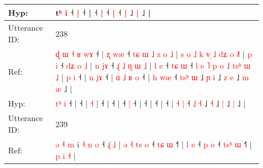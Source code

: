\documentclass[10pt]{article}
\DeclareRobustCommand{\hl}[1]{{\textcolor{red}{#1}}}
\begin{document}
\begin{longtable}{ll}
Hyp: & \hl{}\hl{}\hl{}\hl{}\hl{}\hl{}\hl{}t\hl{}\hl{}\hl{}\hl{}\hl{}\hl{}\hl{}\hl{}\hl{}\hl{}\hl{}\hl{}\hl{}\hl{}\hl{}\hl{}\hl{}\hl{}\hl{}\hl{}\hl{ʰ} \hl{i} ˧\hl{}\hl{} \hl{}\hl{|} ˧ |\hl{}\hl{}\hl{}\hl{} ˧\hl{}\hl{} \hl{|} ˧\hl{}\hl{}\hl{}\hl{} \hl{|} ˧\hl{}\hl{}\hl{}\hl{}\hl{}\hl{}\hl{}\hl{}\hl{}\hl{}\hl{}\hl{}\hl{}\hl{}\hl{} \hl{|} ˩\hl{}\hl{} \hl{|} ˩ |
 \\
\midrule
Utterance ID: & 238 \\
Ref: & \hl{ɖ}\hl{ }\hl{ɯ}\hl{ }\hl{˧}\hl{ }\hl{ʁ} \hl{w}\hl{ɤ} ˧ |\hl{ }\hl{ʐ}\hl{ }\hl{w}\hl{æ} ˧\hl{ }\hl{t}\hl{ɕ}\hl{ }\hl{ɯ}\hl{ }\hl{˩}\hl{ }\hl{z}\hl{ }\hl{o}\hl{ }\hl{˩} |\hl{ }\hl{s}\hl{ }\hl{o}\hl{ }\hl{˩}\hl{ }\hl{k}\hl{ }\hl{v}\hl{̩}\hl{ }\hl{˩}\hl{ }\hl{d}\hl{ʑ}\hl{ }\hl{o} \hl{˩}\hl{˥} |\hl{ }\hl{p}\hl{ }\hl{i} ˧\hl{ }\hl{d}\hl{ʑ}\hl{ }\hl{o}\hl{ }\hl{˩} |\hl{ }\hl{n}\hl{ }\hl{j}\hl{ɤ} ˧\hl{ }\hl{ɻ}\hl{̍}\hl{ }\hl{˩}\hl{ }\hl{ɳ}\hl{ }\hl{ɯ}\hl{ }\hl{˩} |\hl{ }\hl{l}\hl{ }\hl{e} ˧\hl{ }\hl{t}\hl{ɕ} \hl{ɯ} ˧\hl{ }\hl{l}\hl{ }\hl{e}\hl{ }\hl{˥}\hl{ }\hl{p}\hl{ }\hl{o}\hl{ }\hl{˩}\hl{ }\hl{t}\hl{s}\hl{ʰ}\hl{ }\hl{ɯ}\hl{ }\hl{˩} |\hl{ }\hl{p}\hl{ }\hl{i} ˧ |\hl{ }\hl{n}\hl{ }\hl{j}\hl{ɤ} ˧ |\hl{ }\hl{ɑ}\hl{ }\hl{˩}\hl{ }\hl{ʁ}\hl{ }\hl{o} ˧ | \hl{h} \hl{w}\hl{æ} ˧ \hl{t}\hl{s}\hl{ʰ} \hl{ɯ} ˩\hl{ }\hl{ɲ} \hl{i} ˩\hl{ }\hl{z} \hl{e} ˩\hl{ }\hl{m} \hl{æ} ˩ |
 \\
Hyp: & \hl{}\hl{}\hl{}\hl{}\hl{}\hl{t}\hl{ʰ} \hl{}\hl{i} ˧ |\hl{}\hl{}\hl{}\hl{}\hl{} ˧\hl{}\hl{}\hl{}\hl{}\hl{}\hl{}\hl{}\hl{}\hl{}\hl{}\hl{}\hl{}\hl{} |\hl{}\hl{}\hl{}\hl{}\hl{}\hl{}\hl{}\hl{}\hl{}\hl{}\hl{}\hl{}\hl{}\hl{}\hl{}\hl{}\hl{}\hl{} \hl{}\hl{˧} |\hl{}\hl{}\hl{}\hl{} ˧\hl{}\hl{}\hl{}\hl{}\hl{}\hl{}\hl{} |\hl{}\hl{}\hl{}\hl{}\hl{} ˧\hl{}\hl{}\hl{}\hl{}\hl{}\hl{}\hl{}\hl{}\hl{}\hl{}\hl{} |\hl{}\hl{}\hl{}\hl{} ˧\hl{}\hl{}\hl{} \hl{|} ˧\hl{}\hl{}\hl{}\hl{}\hl{}\hl{}\hl{}\hl{}\hl{}\hl{}\hl{}\hl{}\hl{}\hl{}\hl{}\hl{}\hl{}\hl{}\hl{}\hl{} |\hl{}\hl{}\hl{}\hl{} ˧ |\hl{}\hl{}\hl{}\hl{}\hl{} ˧ |\hl{}\hl{}\hl{}\hl{}\hl{}\hl{}\hl{}\hl{} ˧ | \hl{˧} \hl{}\hl{|} ˧ \hl{}\hl{}\hl{˩} \hl{˧} ˩\hl{}\hl{} \hl{˧} ˩\hl{}\hl{} \hl{|} ˩\hl{}\hl{} \hl{|} ˩ |
 \\
\midrule
Utterance ID: & 239 \\
Ref: & \hl{ə}\hl{ }\hl{˧}\hl{ }\hl{m} i\hl{ }\hl{˧}\hl{ }\hl{n}\hl{ }\hl{o} ˧\hl{ }\hl{ɻ}\hl{̍}\hl{ }\hl{˩} |\hl{ }\hl{ə}\hl{ }\hl{˧}\hl{ }\hl{t}\hl{s}\hl{ }\hl{o} ˧\hl{ }\hl{t}\hl{ɕ} \hl{ɯ} ˧\hl{˥} |\hl{ }\hl{l}\hl{ }\hl{e} ˧\hl{ }\hl{p} \hl{o} ˧\hl{ }\hl{t}\hl{s}\hl{ʰ} \hl{ɯ} ˧\hl{˥} | \hl{p} \hl{i} \hl{˧} |
 \\

\end{longtable}
\end{document}
